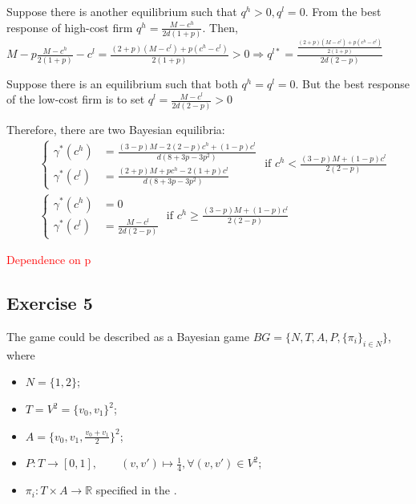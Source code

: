 \documentclass[]{article}
\begin{document}
Suppose there is another equilibrium such that $q^h > 0, q^l = 0$. From the best response of high-cost firm $q^h = \frac{M - c^h}{2d(1 + p)}$. Then, $M - p\frac{M - c^h}{2(1 + p)} - c^l = \frac{(2 + p)(M - c^l) + p(c^h - c^l)}{2(1 + p)} > 0 \Rightarrow q^{l*} = \frac{\frac{(2 + p)(M - c^l) + p(c^h - c^l)}{2(1 + p)}}{2d(2 - p)}$ \Lightning

Suppose there is an equilibrium such that both $q^h = q^l = 0$. But the best response of the low-cost firm is to set $q^l = \frac{M - c^l}{2d(2 - p)} > 0$ \Lightning

Therefore, there are two Bayesian equilibria:
\begin{equation}
	\begin{split}
		&\begin{cases}
			\gamma^*(c^h)& = \frac{(3 - p)M - 2(2 - p)c^h + (1 - p)c^l}{d(8 + 3p - 3p^2)} \\
			\gamma^*(c^l)& = \frac{(2 + p)M + pc^h - 2(1 + p)c^l}{d(8 + 3p - 3p^2)}
		\end{cases}\text{ if } c^h < \frac{(3 - p)M + (1 - p)c^l}{2(2 - p)}\\ \nonumber
		&\begin{cases}
			\gamma^*(c^h)& = 0 \\
			\gamma^*(c^l)& = \frac{M - c^l}{2d(2 - p)}
		\end{cases}\text{ if } c^h \geq \frac{(3 - p)M + (1 - p)c^l}{2(2 - p)}
	\end{split}
\end{equation}

{\huge\textcolor{red}{Dependence on p}}

\subsection*{Exercise 5}

The game could be described as a Bayesian game $BG = \{N, T, A, P, \{\pi_i\}_{i\in N}\}$, where
\begin{itemize}[label={}]
	\item $N = \{1, 2\}$;
	\item $T = V^2 = \{v_0, v_1\}^2$;
	\item $A = \{v_0, v_1, \frac{v_0 + v_1}{2}\}^2$;
	\item $P: T \to [0, 1], \qquad (v, v') \mapsto \frac{1}{4},\forall(v, v')\in V^2$;
	\item $\pi_i: T\times A\to \mathbb{R}$ specified in the .
\end{itemize}
\end{document}
